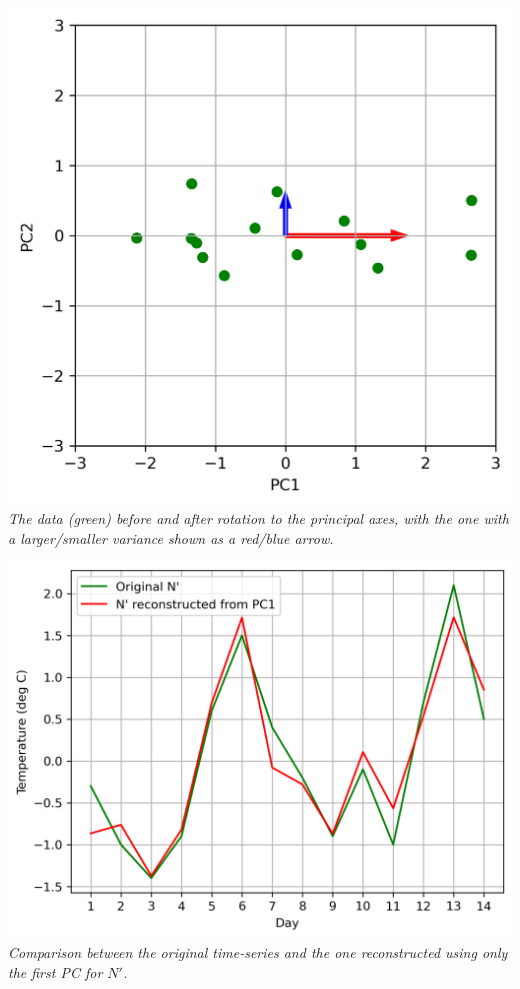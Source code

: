 \begin{solution}
\begin{center}
\includegraphics[scale = 0.6]{graphics/PCA_exmp_2.png}\\
\textit{The data (green) before and after rotation to the principal axes, with the one with a larger/smaller variance shown as a red/blue arrow.}
\end{center}
\begin{center}
\includegraphics[scale = 0.8]{graphics/PCA_exmp_3.png}\\
\textit{Comparison between the original time-series and the one reconstructed using only the first PC for $N'$.}
\end{center}
\end{solution}

